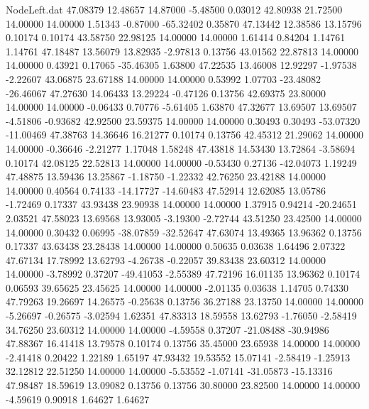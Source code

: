 \begin{filecontents}{NodeLeft.dat}
  47.08379   12.48657   14.87000    -5.48500    0.03012   42.80938   21.72500   14.00000   14.00000    1.51343   -0.87000  -65.32402    0.35870
  47.13442   12.38586   13.15796     0.10174    0.10174   43.58750   22.98125   14.00000   14.00000    1.61414    0.84204    1.14761    1.14761
  47.18487   13.56079   13.82935    -2.97813    0.13756   43.01562   22.87813   14.00000   14.00000    0.43921    0.17065  -35.46305    1.63800
  47.22535   13.46008   12.92297    -1.97538   -2.22607   43.06875   23.67188   14.00000   14.00000    0.53992    1.07703  -23.48082  -26.46067
  47.27630   14.06433   13.29224    -0.47126    0.13756   42.69375   23.80000   14.00000   14.00000   -0.06433    0.70776   -5.61405    1.63870
  47.32677   13.69507   13.69507    -4.51806   -0.93682   42.92500   23.59375   14.00000   14.00000    0.30493    0.30493  -53.07320  -11.00469
  47.38763   14.36646   16.21277     0.10174    0.13756   42.45312   21.29062   14.00000   14.00000   -0.36646   -2.21277    1.17048    1.58248
  47.43818   14.53430   13.72864    -3.58694    0.10174   42.08125   22.52813   14.00000   14.00000   -0.53430    0.27136  -42.04073    1.19249
  47.48875   13.59436   13.25867    -1.18750   -1.22332   42.76250   23.42188   14.00000   14.00000    0.40564    0.74133  -14.17727  -14.60483
  47.52914   12.62085   13.05786    -1.72469    0.17337   43.93438   23.90938   14.00000   14.00000    1.37915    0.94214  -20.24651    2.03521
  47.58023   13.69568   13.93005    -3.19300   -2.72744   43.51250   23.42500   14.00000   14.00000    0.30432    0.06995  -38.07859  -32.52647
  47.63074   13.49365   13.96362     0.13756    0.17337   43.63438   23.28438   14.00000   14.00000    0.50635    0.03638    1.64496    2.07322
  47.67134   17.78992   13.62793    -4.26738   -0.22057   39.83438   23.60312   14.00000   14.00000   -3.78992    0.37207  -49.41053   -2.55389
  47.72196   16.01135   13.96362     0.10174    0.06593   39.65625   23.45625   14.00000   14.00000   -2.01135    0.03638    1.14705    0.74330
  47.79263   19.26697   14.26575    -0.25638    0.13756   36.27188   23.13750   14.00000   14.00000   -5.26697   -0.26575   -3.02594    1.62351
  47.83313   18.59558   13.62793    -1.76050   -2.58419   34.76250   23.60312   14.00000   14.00000   -4.59558    0.37207  -21.08488  -30.94986
  47.88367   16.41418   13.79578     0.10174    0.13756   35.45000   23.65938   14.00000   14.00000   -2.41418    0.20422    1.22189    1.65197
  47.93432   19.53552   15.07141    -2.58419   -1.25913   32.12812   22.51250   14.00000   14.00000   -5.53552   -1.07141  -31.05873  -15.13316
  47.98487   18.59619   13.09082     0.13756    0.13756   30.80000   23.82500   14.00000   14.00000   -4.59619    0.90918    1.64627    1.64627

\end{filecontents}
